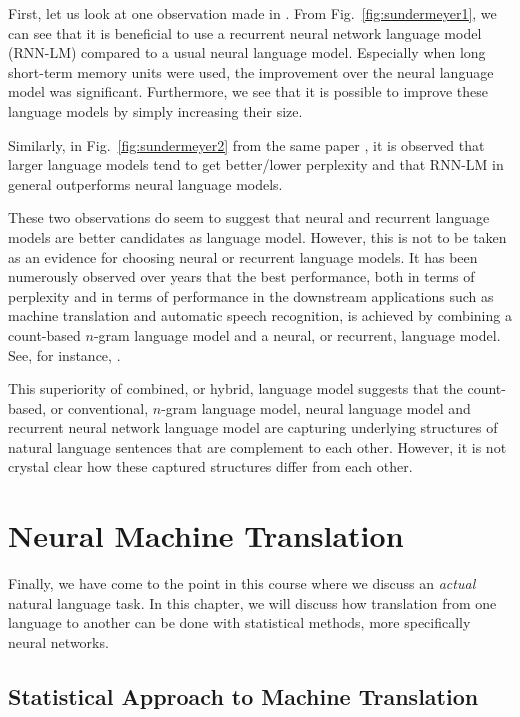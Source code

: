 \documentclass{report}
\begin{document}
First, let us look at one observation made in \cite{sundermeyer2015feedforward}.
From Fig.~\ref{fig:sundermeyer1}, we can see that it is beneficial to use a
recurrent neural network language model (RNN-LM) compared to a usual neural
language model. Especially when long short-term memory units were used, the
improvement over the neural language model was significant. Furthermore, we see
that it is possible to improve these language models by simply increasing their
size. 

Similarly, in Fig.~\ref{fig:sundermeyer2} from the same paper
\cite{sundermeyer2015feedforward}, it is observed that larger language models
tend to get better/lower perplexity and that RNN-LM in general outperforms
neural language models. 

These two observations do seem to suggest that neural and recurrent language
models are better candidates as language model. However, this is not to be taken
as an evidence for choosing neural or recurrent language models. It has been
numerously observed over years that the best performance, both in terms of
perplexity and in terms of performance in the downstream applications such as
machine translation and automatic speech recognition, is achieved by combining
a count-based $n$-gram language model and a neural, or recurrent, language
model. See, for instance, \cite{schwenk2007continuous}.

This superiority of combined, or hybrid, language model suggests that the
count-based, or conventional, $n$-gram language model, neural language model and
recurrent neural network language model are capturing underlying structures of
natural language sentences that are complement to each other. However, it is not
crystal clear how these captured structures differ from each other.

\chapter{Neural Machine Translation}
\label{chap:nmt}

Finally, we have come to the point in this course where we discuss an {\em
actual} natural language task. In this chapter, we will discuss how translation
from one language to another can be done with statistical methods, more
specifically neural networks.

\section{Statistical Approach to Machine Translation}
\end{document}
